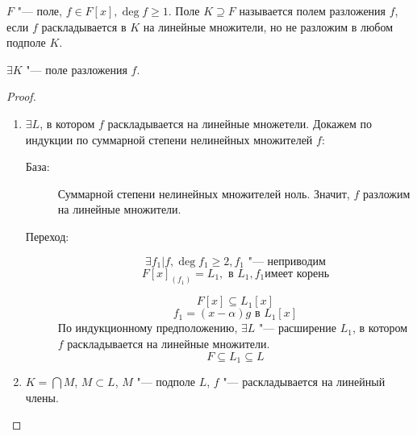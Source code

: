 \begin{Def}
$F$ "--- поле, $f \in F[x], \deg f \geq 1$. Поле $K \supseteq F$ называется полем разложения $f$, если $f$ раскладывается в $K$ на линейные множители, но не разложим в любом подполе $K$.
\end{Def}
\begin{theorem}
$\exists K$ "--- поле разложения $f$.
\end{theorem}
\begin{proof}
\begin{enumerate}
\item $\exists L$, в котором $f$ раскладывается на линейные множетели.
Докажем по индукции по суммарной степени нелинейных множителей $f$:
\begin{description}
\item[База:] Суммарной степени нелинейных множителей ноль. 
Значит, $f$ разложим на линейные множители.
\item[Переход:] 
$$\exists f_1 | f, \deg f_1 \geq 2, f_1 \text{ "--- неприводим}$$
$$F[x]_{(f_1)} = L_1, \text{ в } L_1, f_1 \text{имеет корень}$$

$$F[x] \subseteq L_1[x]$$
$$f_1 = (x - \alpha)g \text{ в } L_1[x]$$
По индукционному предположению, $\exists L$ "--- расширение $L_1$, в котором $f$ раскладывается на линейные множители.
$$F \subseteq L_1 \subseteq L$$
\end{description}
\item $K = \bigcap M$, $M \subset L$, $M$ "--- подполе $L$, $f$ "--- раскладывается на линейный члены.
\end{enumerate}
\end{proof}
